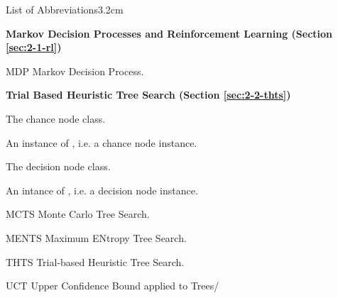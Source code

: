 \begin{mclistof}{List of Abbreviations}{3.2cm}

    
    \item[\Large\textbf{Markov Decision Processes and Reinforcement Learning (Section \ref{sec:2-1-rl})}\hfill\hfill]
    \item[MDP] Markov Decision Process.
    \\
    \item[\Large\textbf{Trial Based Heuristic Tree Search (Section \ref{sec:2-2-thts})}\hfill\hfill] 
    \item[\CNODE] 
        The chance node class.
    \item[\cnode] 
        An instance of \CNODE, i.e. a chance node instance.
    \item[\DNODE] 
        The decision node class.
    \item[\dnode] 
        An intance of \DNODE, i.e. a decision node instance.
    \item[MCTS] 
        Monte Carlo Tree Search.
    \item[MENTS]
        Maximum ENtropy Tree Search.
    \item[THTS] 
        Trial-based Heuristic Tree Search.
    \item[\thtspp] 
    \item[UCT] 
        Upper Confidence Bound applied to Trees/
    

\end{mclistof} 
